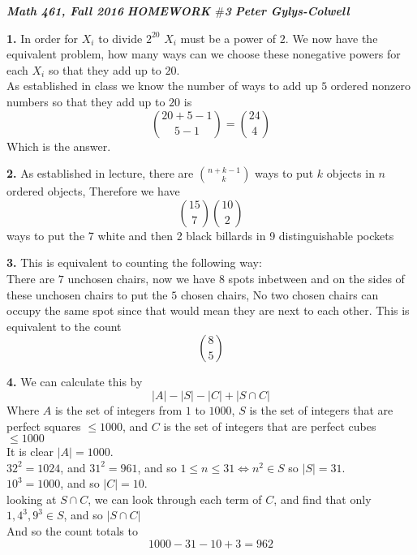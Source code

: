 \documentclass[12pt]{article}
\newenvironment{ques}{\vspace{2 ex}}{\vspace{2 ex}}
\theoremstyle{definition}
\begin{document}
\noindent \textit{\textbf{Math 461, Fall 2016}} \hspace{1.3cm} \textit{\textbf{HOMEWORK $\#$3}} \hspace{1.3cm} \textit{\textbf{Peter Gylys-Colwell}} 

\vspace{1cm}

\begin{ques}
	\textbf{1.}
		In order for $X_i$ to divide $2^{20}$ $X_i$ must be a power of
		$2$. We now have the equivalent problem, how many ways can we
		choose these nonegative powers for each $X_i$ so that they add
		up to $20$.\\
		As established in class we know the number of ways to add up
		$5$ ordered nonzero numbers so that they add up to $20$ is
		$$\binom{20 + 5 - 1}{5 - 1} = \binom{24}{4}$$
		Which is the answer.
\end{ques}

\begin{ques}
	\textbf{2.} As established in lecture, there are $\binom{n + k - 1}{k}$
	ways to put $k$ objects in $n$ ordered objects, Therefore we have
	$$\binom{15}{7}\binom{10}{2}$$
	ways to put the 7 white and then 2 black billards in 9 distinguishable pockets

\end{ques}

\begin{ques}
	\textbf{3.} This is equivalent to counting the following way:\\
		There are $7$ unchosen chairs, now we have $8$ spots inbetween
		and on the sides of these unchosen chairs to put the $5$ chosen
		chairs, No two chosen chairs can occupy the same spot since
		that would mean they are next to each other. This is equivalent
		to the count
		$${8}\choose{5}$$
	
\end{ques}

\begin{ques}
	\textbf{4.}
		We can calculate this by 
		$$|A| - |S| - |C| + |S \cap C|$$
		Where $A$ is the set of integers from $1$ to $1000$, $S$ is the
		set of integers that are perfect squares $\leq 1000$, and
		$C$ is the set of integers that are perfect cubes $\leq 1000$\\
		It is clear $|A| = 1000$.\\ 
		$32^2 = 1024$, and $31^2 = 961$, and so $1 \leq n \leq 31
		\Leftrightarrow n^2 \in S$ so $|S| = 31$.\\
		$10^3 = 1000$, and so $|C| = 10$.\\
		looking at $S \cap C$, we can look through each term of $C$,
		and find that only $1,4^3,9^3 \in S$, and so $|S \cap C|$\\
		And so the count totals to 
		$$1000 - 31 - 10 + 3 = 962$$
\end{ques}
\end{document}

